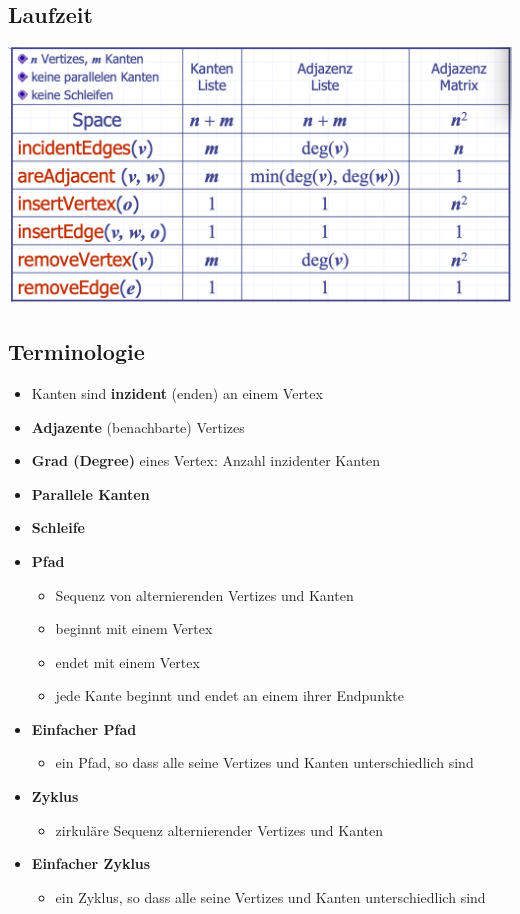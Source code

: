 \subsection{Laufzeit}
\begin{center}
    \includegraphics[scale=.2]{graphic/11 Graph/Laufzeit.png}
\end{center}
\vspace{-8pt}


\subsection{Terminologie}
\begin{itemize}
    \item Kanten sind \textbf{inzident} (enden) an einem Vertex
    \item \textbf{Adjazente} (benachbarte) Vertizes
    \item \textbf{Grad (Degree)} eines Vertex: Anzahl inzidenter Kanten
    \item \textbf{Parallele Kanten}
    \item \textbf{Schleife}
    \item \textbf{Pfad}
    \begin{itemize}
        \item Sequenz von alternierenden Vertizes und Kanten
        \item beginnt mit einem Vertex
        \item endet mit einem Vertex
        \item jede Kante beginnt und endet an einem ihrer Endpunkte
    \end{itemize}
    \item \textbf{Einfacher Pfad}
    \begin{itemize}
        \item ein Pfad, so dass alle seine Vertizes und Kanten unterschiedlich sind
    \end{itemize}
    \item \textbf{Zyklus}
    \begin{itemize}
        \item zirkuläre Sequenz alternierender Vertizes und Kanten
    \end{itemize}
    \item \textbf{Einfacher Zyklus}
    \begin{itemize}
        \item ein Zyklus, so dass alle seine Vertizes und Kanten unterschiedlich sind
    \end{itemize}
\end{itemize}


